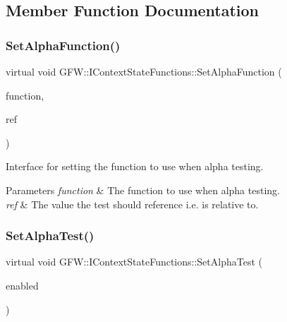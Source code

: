 \subsection{Member Function Documentation}
\mbox{\label{class_g_f_w_1_1_i_context_state_functions_ac4215f1ec06659fbc5cc7b4e494373c5}} 
\subsubsection{\texorpdfstring{Set\+Alpha\+Function()}{SetAlphaFunction()}}
{\footnotesize\ttfamily virtual void G\+F\+W\+::\+I\+Context\+State\+Functions\+::\+Set\+Alpha\+Function (\begin{DoxyParamCaption}\item[{\hyperlink{namespace_g_f_w_a2eabb5a646179bceaab2d5e3bfce2316}{Test\+Function}}]{function,  }\item[{float}]{ref }\end{DoxyParamCaption})\hspace{0.3cm}{\ttfamily [pure virtual]}}



Interface for setting the function to use when alpha testing. 


\begin{DoxyParams}{Parameters}
{\em function} & The function to use when alpha testing. \\
\hline
{\em ref} & The value the test should reference i.\+e. is relative to. \\
\hline
\end{DoxyParams}
\mbox{\label{class_g_f_w_1_1_i_context_state_functions_a4a0295664771c0a7654414cb620c2e10}} 
\subsubsection{\texorpdfstring{Set\+Alpha\+Test()}{SetAlphaTest()}}
{\footnotesize\ttfamily virtual void G\+F\+W\+::\+I\+Context\+State\+Functions\+::\+Set\+Alpha\+Test (\begin{DoxyParamCaption}\item[{bool}]{enabled }\end{DoxyParamCaption})\hspace{0.3cm}{\ttfamily [pure virtual]}}



